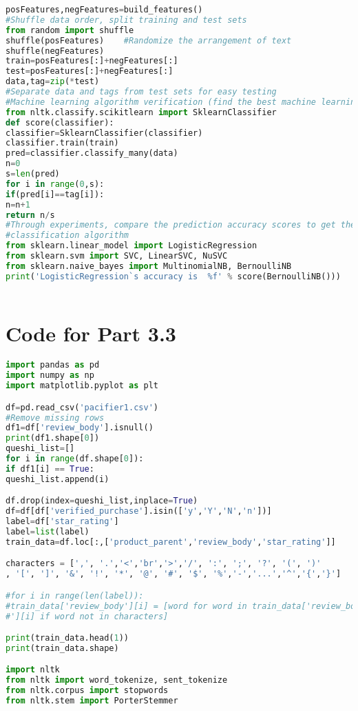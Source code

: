 \documentclass{mcmthesis}
\begin{document}
\begin{appendices}
\begin{lstlisting}[language=python]
posFeatures,negFeatures=build_features()
#Shuffle data order, split training and test sets
from random import shuffle
shuffle(posFeatures)    #Randomize the arrangement of text
shuffle(negFeatures)
train=posFeatures[:]+negFeatures[:]
test=posFeatures[:]+negFeatures[:]
data,tag=zip(*test)
#Separate data and tags from test sets for easy testing
#Machine learning algorithm verification (find the best machine learning algorithm)
from nltk.classify.scikitlearn import SklearnClassifier
def score(classifier):
classifier=SklearnClassifier(classifier)
classifier.train(train)
pred=classifier.classify_many(data)
n=0
s=len(pred)
for i in range(0,s):
if(pred[i]==tag[i]):
n=n+1
return n/s
#Through experiments, compare the prediction accuracy scores to get the best 
#classification algorithm
from sklearn.linear_model import LogisticRegression
from sklearn.svm import SVC, LinearSVC, NuSVC
from sklearn.naive_bayes import MultinomialNB, BernoulliNB
print('LogisticRegression`s accuracy is  %f' % score(BernoulliNB()))



\end{lstlisting}

\section{Code for Part 3.3}
\begin{lstlisting}[language=python]
import pandas as pd
import numpy as np
import matplotlib.pyplot as plt

df=pd.read_csv('pacifier1.csv')
#Remove missing rows
df1=df['review_body'].isnull()
print(df1.shape[0])
queshi_list=[]
for i in range(df.shape[0]):
if df1[i] == True:
queshi_list.append(i)

df.drop(index=queshi_list,inplace=True)
df=df[df['verified_purchase'].isin(['y','Y','N','n'])]
label=df['star_rating']
label=list(label)
train_data=df.loc[:,['product_parent','review_body','star_rating']]

characters = [',', '.','<','br','>','/', ':', ';', '?', '(', ')'
, '[', ']', '&', '!', '*', '@', '#', '$', '%','-','...','^','{','}']

#for i in range(len(label)):
#train_data['review_body'][i] = [word for word in train_data['review_body
#'][i] if word not in characters]

print(train_data.head(1))
print(train_data.shape)

import nltk
from nltk import word_tokenize, sent_tokenize
from nltk.corpus import stopwords
from nltk.stem import PorterStemmer


\end{lstlisting}
\end{appendices}
\end{document}

